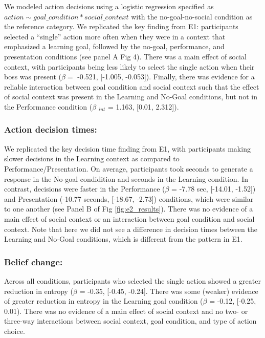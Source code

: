 \documentclass[10pt, letterpaper]{article}
\begin{document}
We modeled action decisions using a logistic regression specified as
\texttt{$action \sim goal\_condition * social\_context$} with the
no-goal-no-social condition as the reference category. We replicated the
key finding from E1: participants selected a ``single'' action more
often when they were in a context that emphasized a learning goal,
followed by the no-goal, performance, and presentation conditions (see
panel A Fig 4). There was a main effect of social context, with
participants being less likely to select the single action when their
boss was present (\(\beta =\) -0.521, {[}-1.005, -0.053{]}). Finally,
there was evidence for a reliable interaction between goal condition and
social context such that the effect of social context was present in the
Learning and No-Goal conditions, but not in the Performance condition
(\(\beta\) \(_{int}\) = 1.163, {[}0.01, 2.312{]}).

\subsubsection{Action decision times:}\label{action-decision-times-1}

We replicated the key decision time finding from E1, with participants
making slower decisions in the Learning context as compared to
Performance/Presentation. On average, participants took seconds to
generate a response in the No-goal condidition and seconds in the
Learning condition. In contrast, decisions were faster in the
Performance (\(\beta\) = -7.78 sec, {[}-14.01, -1.52{]}) and
Presentation (-10.77 seconds, {[}-18.67, -2.73{]}) conditions, which
were similar to one another (see Panel B of Fig \ref{fig:e2_results}).
There was no evidence of a main effect of social context or an
interaction between goal condition and social context. Note that here we
did not see a difference in decision times between the Learning and
No-Goal conditions, which is different from the pattern in E1.

\subsubsection{Belief change:}\label{belief-change-1}

Across all conditions, participants who selected the single action
showed a greater reduction in entropy (\(\beta\) = -0.35, {[}-0.45,
-0.24{]}. There was some (weaker) evidence of greater reduction in
entropy in the Learning goal condition (\(\beta\) = -0.12, {[}-0.25,
0.01). There was no evidence of a main effect of social context and no
two- or three-way interactions between social context, goal condition,
and type of action choice.
\end{document}
